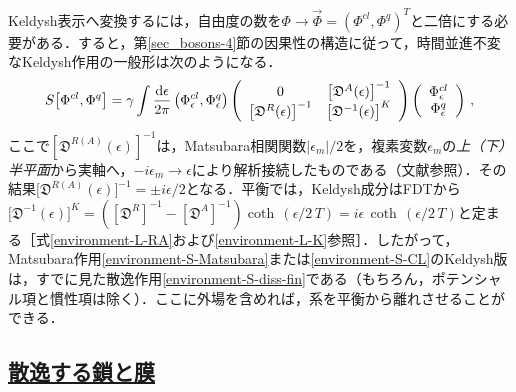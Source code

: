 \documentclass[a4paper,11pt]{ltjsarticle}
\newcommand{\subsectionlink}[1]{\subsection[#1]{\hyperlink{toc}{#1}}}
\def\d{\mathrm{d}}
\begin{document}
Keldysh表示へ変換するには，自由度の数を$\Phi\to
\vec{\Phi}=(\Phi^{cl},\Phi^q)^T$と二倍にする必要がある．すると，第\ref{sec_bosons-4}節の因果性の構造に従って，時間並進不変なKeldysh作用の一般形は次のようになる．
\begin{equation}
S\big[\Phi^{cl},\Phi^{q}\big] = \gamma\int{\d\epsilon\over 2\pi}\,
\big(\Phi^{cl}_{\epsilon},\Phi^q_{\epsilon}\big)
\left(\begin{array}{cc}
0   & \big[\mathfrak{D}^{A}(\epsilon)\big]^{-1}  \\
 \big[\mathfrak{D}^{R}(\epsilon)\big]^{-1}  & \big[\mathfrak{D}^{-1}(\epsilon)\big]^{K}
\end{array}\right)
\left(\begin{array}{c} \Phi^{cl}_{\epsilon} \\ \Phi^q_{\epsilon}
\end{array}\right) \, ,
\end{equation}ここで$[\mathfrak{D}^{R(A)}(\epsilon)]^{-1} $は，Matsubara相関関数$|\epsilon_m|/2$を，複素変数$\epsilon_m$の\emph{上（下）半平面}から実軸へ，$-i\epsilon_m\to \epsilon$により解析接続したものである（文献\cite{AGD}参照）．その結果$\big[\mathfrak{D}^{R(A)}(\epsilon)\big]^{-1}=\pm
i\epsilon/2$となる．平衡では，Keldysh成分はFDTから$\big[\mathfrak{D}^{-1}(\epsilon)\big]^{K}=
([\mathfrak{D}^{R}]^{-1}-[\mathfrak{D}^{A}]^{-1}) \coth\,
(\epsilon/2\,T)=i\epsilon\,\coth\, (\epsilon/2\,T)$と定まる［式\eqref{environment-L-RA}および\eqref{environment-L-K}参照］．したがって，Matsubara作用\eqref{environment-S-Matsubara}または\eqref{environment-S-CL}のKeldysh版は，すでに見た散逸作用\eqref{environment-S-diss-fin}である（もちろん，ポテンシャル項と慣性項は除く）．ここに外場を含めれば，系を平衡から離れさせることができる．


\subsectionlink{散逸する鎖と膜}\label{sec_environment-8}
\end{document}
